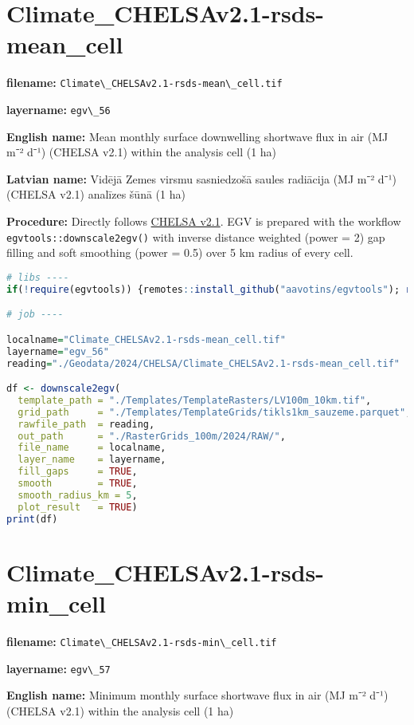 \documentclass[
]{book}
\newcommand{\passthrough}[1]{#1}
\begin{document}
\section{Climate\_CHELSAv2.1-rsds-mean\_cell}\label{ch06.056}

\textbf{filename:} \passthrough{\lstinline!Climate\_CHELSAv2.1-rsds-mean\_cell.tif!}

\textbf{layername:} \passthrough{\lstinline!egv\_56!}

\textbf{English name:} Mean monthly surface downwelling shortwave flux in air (MJ m⁻² d⁻¹) (CHELSA v2.1) within the analysis cell (1 ha)

\textbf{Latvian name:} Vidējā Zemes virsmu sasniedzošā saules radiācija (MJ m⁻² d⁻¹) (CHELSA v2.1) analīzes šūnā (1 ha)

\textbf{Procedure:} Directly follows \hyperref[Ch04.11]{CHELSA v2.1}. EGV is prepared with the
workflow \passthrough{\lstinline!egvtools::downscale2egv()!} with inverse distance weighted (power = 2)
gap filling and soft smoothing (power = 0.5) over 5 km radius of every cell.

\begin{lstlisting}[language=R]
# libs ----
if(!require(egvtools)) {remotes::install_github("aavotins/egvtools"); require(egvtools)}

# job ----

localname="Climate_CHELSAv2.1-rsds-mean_cell.tif"
layername="egv_56"
reading="./Geodata/2024/CHELSA/Climate_CHELSAv2.1-rsds-mean_cell.tif"

df <- downscale2egv(
  template_path = "./Templates/TemplateRasters/LV100m_10km.tif",
  grid_path     = "./Templates/TemplateGrids/tikls1km_sauzeme.parquet",
  rawfile_path  = reading,
  out_path      = "./RasterGrids_100m/2024/RAW/",
  file_name     = localname,
  layer_name    = layername,
  fill_gaps     = TRUE,
  smooth        = TRUE,
  smooth_radius_km = 5,
  plot_result   = TRUE)
print(df)
\end{lstlisting}

\section{Climate\_CHELSAv2.1-rsds-min\_cell}\label{ch06.057}

\textbf{filename:} \passthrough{\lstinline!Climate\_CHELSAv2.1-rsds-min\_cell.tif!}

\textbf{layername:} \passthrough{\lstinline!egv\_57!}

\textbf{English name:} Minimum monthly surface shortwave flux in air (MJ m⁻² d⁻¹) (CHELSA v2.1) within the analysis cell (1 ha)
\end{document}
